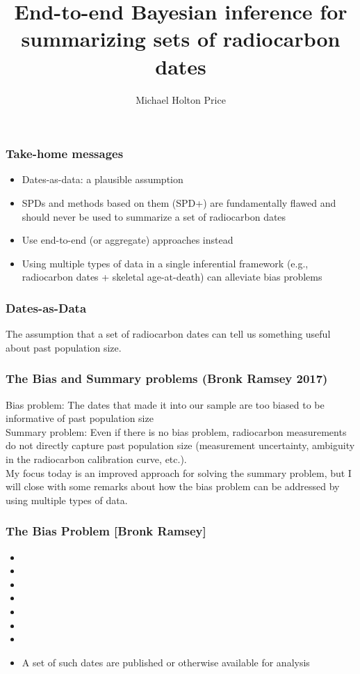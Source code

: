 \documentclass{beamer}
\title[Bayesian Radiocarbon]{End-to-end Bayesian inference for summarizing sets of radiocarbon dates}
\author{Michael Holton Price}
\institute[SFI] {
	Santa Fe Institute\\
	MichaelHoltonPrice@gmail.com\\
	\line(1,0){0}\\
	Society for American Archaeology\\
	22 Mar 2021\\
}
\date{}
\begin{document}
\begin{frame}[plain]
  \titlepage
\end{frame}

\begin{frame}[t]
  \frametitle{Take-home messages}
  \pause
  \begin{itemize}
    \item Dates-as-data: a plausible assumption
    \pause
    \item SPDs and methods based on them (SPD+) are fundamentally flawed and should never be used to summarize a set of radiocarbon dates
    \pause
    \item Use end-to-end (or aggregate) approaches instead
    \pause
    \item Using multiple types of data in a single inferential framework (e.g., radiocarbon dates + skeletal age-at-death) can alleviate bias problems
  \end{itemize}
\end{frame}

\begin{frame}[t]
  \frametitle{Dates-as-Data}
  The assumption that a set of radiocarbon dates can tell us something useful about past population size.
\end{frame}

\begin{frame}[t]
  \frametitle{The Bias and Summary problems (Bronk Ramsey 2017)}
  Bias problem: The dates that made it into our sample are too biased to be informative of past population size\\
  \bigskip
  \pause
  Summary problem: Even if there is no bias problem, radiocarbon measurements do not directly capture past population size (measurement uncertainty, ambiguity in the radiocarbon calibration curve, etc.).\\
  \bigskip
  \pause
  My focus today is an improved approach for solving the summary problem, but I will close with some remarks about how the bias problem can be addressed by using multiple types of data.\\
\end{frame}

\begin{frame}[t]
  \frametitle{The Bias Problem [Bronk Ramsey]}
  \begin{itemize}
    \item
    \item
    \item
    \item
    \item
    \item
    \item
    \item A set of such dates are published or otherwise available for analysis
  \end{itemize}
\end{frame}
\end{document}

